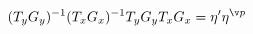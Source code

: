 \begin{equation}
\label{TxTyeta}
(T_yG_y)^{-1} (T_xG_x)^{-1} T_yG_y T_xG_x = \eta'\eta^{\v p}
\end{equation}

